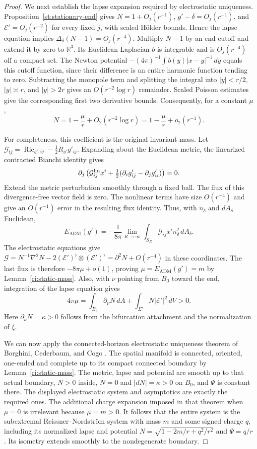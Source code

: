 \begin{proof}
We next establish the lapse expansion required by electrostatic
uniqueness.  Proposition~\ref{st:stationary-end} gives
$N=1+O_j(r^{-1})$, $g'-\delta=O_j(r^{-1})$, and
$\mathcal E'=O_j(r^{-2})$ for every fixed $j$, with scaled
H\"older bounds.  Hence the lapse equation implies
$\Delta_\delta(N-1)=O_j(r^{-4})$.
Multiply $N-1$ by an end cutoff and extend it by zero to
$\mathbb R^3$.  Its Euclidean Laplacian $b$ is integrable and is
$O_j(r^{-4})$ off a compact set.  The Newton potential
$-(4\pi)^{-1}\int b(y)|x-y|^{-1}\,dy$ equals this cutoff
function, since their difference is an entire harmonic function
tending to zero.  Subtracting the monopole term and splitting the
integral into $|y|<r/2$, $|y|\asymp r$, and $|y|>2r$ gives
an $O(r^{-2}\log r)$ remainder.  Scaled Poisson estimates give
the corresponding first two derivative bounds.  Consequently,
for a constant $\mu$,
\[
 N=1-\frac\mu r+O_2(r^{-2}\log r)
       =1-\frac\mu r+o_2(r^{-1}).
\]

For completeness, this coefficient is the original invariant mass.
Let $\mathcal G_{ij}=\operatorname{Ric}_{g',ij}
-\tfrac12R_{g'}g'_{ij}$.  Expanding about the Euclidean metric,
the linearized contracted Bianchi identity gives
\[
 \partial_j\left(\mathcal G^{\rm lin}_{ij}x^i
       +\tfrac12(\partial_i g'_{ij}-\partial_j g'_{ii})\right)=0.
\]
Extend the metric perturbation smoothly through a fixed ball.
The flux of this divergence-free vector field is zero.  The
nonlinear terms have size $O(r^{-4})$
and give an $O(r^{-1})$ error in the resulting flux identity.
Thus, with $n_\delta$ and $dA_\delta$ Euclidean,
\[
 E_{\mathrm{ADM}}(g')
 =-\frac1{8\pi}\lim_{R\to\infty}
       \int_{S_R}\mathcal G_{ij}x^i n_\delta^j\,dA_\delta.
\]
The electrostatic equations give
$\mathcal G=N^{-1}\nabla^2N
-2(\mathcal E')^\flat\otimes(\mathcal E')^\flat
=\partial^2N+O(r^{-4})$ in these coordinates.
The last flux is therefore $-8\pi\mu+o(1)$, proving
$\mu=E_{\mathrm{ADM}}(g')=m$ by Lemma~\ref{ri:static-mass}.
Also, with $\nu$ pointing from $B_0$ toward the end, integration
of the lapse equation gives
\[
 4\pi\mu=\int_{B_0}\partial_\nu N\,dA
              +\int_{\Sigma'}N|\mathcal E'|^2\,dV>0.
\]
Here $\partial_\nu N=\kappa>0$ follows from the bifurcation
attachment and the normalization of $\xi$.

We can now apply the connected-horizon electrostatic uniqueness
theorem of Borghini, Cederbaum, and Cogo
\cite[Theorem~3.1 and Proposition~6.1]{BorghiniCederbaumCogo2025}.
The spatial manifold is connected, oriented, one-ended and complete
up to its compact connected boundary by Lemma~\ref{ri:static-mass}.
The metric, lapse and potential are smooth up to that actual
boundary, $N>0$ inside, $N=0$ and $|dN|=\kappa>0$ on $B_0$,
and $\Psi$ is constant there.  The displayed electrostatic
system and asymptotics are exactly the required ones.  The
additional charge expansion imposed in that theorem when
$\mu=0$ is irrelevant because $\mu=m>0$.
It follows that the entire system is the subextremal
Reissner--Nordstr\"om system with mass $m$ and some signed
charge $q$, including its normalized lapse and potential
$N=\sqrt{1-2m/r+q^2/r^2}$ and $\Psi=q/r$.
Its isometry extends smoothly to the nondegenerate boundary.


\end{proof}
